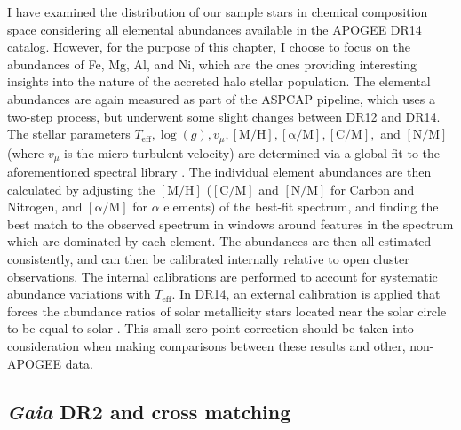I have examined the distribution of our sample stars in chemical
composition space considering all elemental abundances available
in the APOGEE DR14 catalog.  However, for the purpose of this chapter, I choose to
focus on the abundances of Fe, Mg, Al, and Ni, which are the ones
providing interesting insights into the nature of the accreted halo
stellar population. The elemental abundances are again measured as part
of the ASPCAP pipeline, which uses a two-step process, but underwent some slight changes between DR12 and DR14. The
stellar parameters $T_{\mathrm{eff}}, \log(g), v_\mu, \mathrm{[M/H]},
\mathrm{[\alpha/M]}, \mathrm{[C/M]},$ and $\mathrm{[N/M]}$ (where
$v_\mu$ is the micro-turbulent velocity) are determined via a global
fit to the aforementioned spectral library \citep{2015AJ....149..181Z}.
The individual element abundances are then calculated by adjusting
the $\mathrm{[M/H]}$ ($\mathrm{[C/M]}$ and $\mathrm{[N/M]}$ for
Carbon and Nitrogen, and $\mathrm{[\alpha/M]}$ for $\alpha$ elements)
of the best-fit spectrum, and finding the best match to the observed
spectrum in windows around features in the spectrum which are
dominated by each element. The abundances are then all estimated
consistently, and can then be calibrated internally relative to
open cluster observations. The internal calibrations are performed
to account for systematic abundance variations with $T_\mathrm{eff}$.
In DR14, an external calibration is applied that forces the abundance
ratios of solar metallicity stars located near the solar circle to
be equal to solar \citep[][in press]{holtzdr14}.  This small
zero-point correction should be taken into consideration when making
comparisons between these results and other, non-APOGEE data.



\subsection{\emph{Gaia} DR2 and cross matching}

